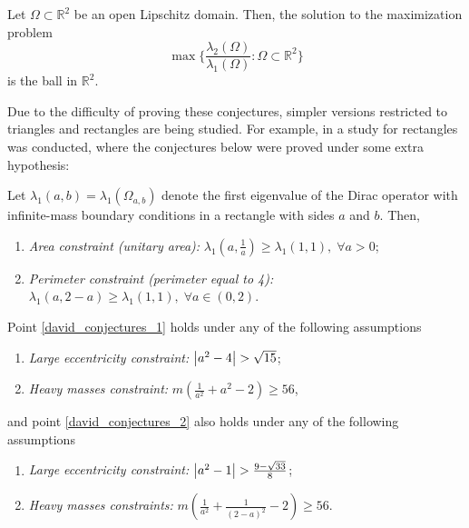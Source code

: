 \begin{conjecture}\label{conjecture_benguria}
    Let \(\Omega \subset \mathbb{R}^2\) be an open Lipschitz domain. Then, the solution to the maximization problem 
    \[
    \max \Big\{\frac{\lambda_2(\Omega)}{\lambda_1(\Omega)}: \Omega \subset \mathbb{R}^2\Big\}
    \]
    is the ball in \(\mathbb{R}^2\).
\end{conjecture}


Due to the difficulty of proving these conjectures, simpler versions restricted to triangles and rectangles are being studied. For example, in \cite{briet2022spectral} a study for rectangles was conducted, where the conjectures below were proved under some extra hypothesis:

\begin{conjecture}\label{david_conjectures}
    Let \(\lambda_1(a, b) = \lambda_1(\Omega_{a, b})\) denote the first eigenvalue of the Dirac operator with infinite-mass boundary conditions in a rectangle with sides \(a\) and \(b\). Then,
    \begin{enumerate}
        \item \label{david_conjectures_1} \textit{Area constraint (unitary area): } \(\lambda_1(a, \frac{1}{a}) \geq \lambda_1(1, 1), \; \forall a>0 \);
        \item  \label{david_conjectures_2} \textit{Perimeter constraint (perimeter equal to 4): } \(\lambda_1(a, 2-a) \geq \lambda_1(1, 1), \; \forall a\in (0, 2)\).
    \end{enumerate}
    Point \ref{david_conjectures_1} holds under any of the following assumptions
    \begin{enumerate}
        \item \textit{Large eccentricity constraint: } \(\abs{a^2-4} > \sqrt{15}\);
        \item \textit{Heavy masses constraint: } \(m \left(\frac{1}{a^2}+a^2-2\right) \geq 56\),
    \end{enumerate}
    and point \ref{david_conjectures_2} also holds under any of the following assumptions
    \begin{enumerate}
        \item \textit{Large eccentricity constraint: } \(\abs{a^2-1} > \frac{9-\sqrt{33}}{8}\);
        \item \textit{Heavy masses constraints: } \(m \left(\frac{1}{a^2}+\frac{1}{(2-a)^2}-2\right) \geq 56\).
    \end{enumerate}
\end{conjecture}

